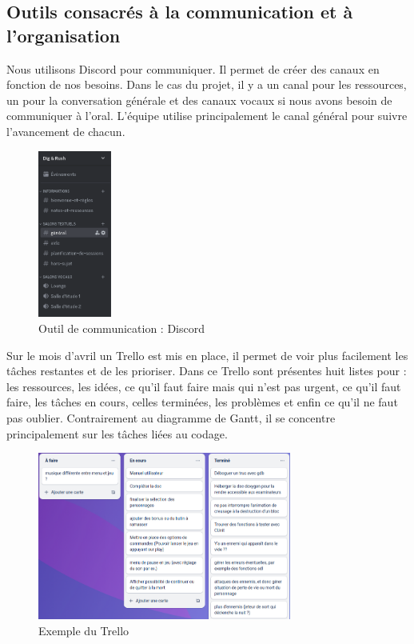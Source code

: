 \documentclass[a4paper,12pt]{article}
\begin{document}
\subsection{Outils consacrés à la communication et à l'organisation}
Nous utilisons Discord pour communiquer. 
Il permet de créer des canaux en fonction de nos besoins. 
Dans le cas du projet, il y a un canal pour les ressources, un pour la conversation générale et des canaux vocaux si nous avons besoin de communiquer à l'oral.
L'équipe utilise principalement le canal général pour suivre l’avancement de chacun.

\begin{figure}[h]
	\centering
	\includegraphics[height=5.5cm]{img/discord.png}
	\caption{Outil de communication : Discord}
	\label{discord}
\end{figure}

Sur le mois d’avril un Trello est mis en place, il permet de voir plus facilement les tâches restantes et de les prioriser. 
Dans ce Trello sont présentes huit listes pour : les ressources, les idées, ce qu’il faut faire mais qui n’est pas urgent, ce qu’il faut faire, les tâches en cours, celles terminées, les problèmes et enfin ce qu’il ne faut pas oublier. 
Contrairement au diagramme de Gantt, il se concentre principalement sur les tâches liées au codage.

\begin{figure}[h]
	\centering
	\includegraphics[height=5.5cm]{img/capture_trello.png}
	\caption{Exemple du Trello}
	\label{trello}
\end{figure}
\end{document}
